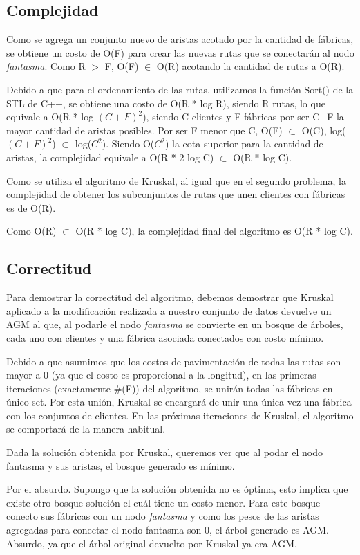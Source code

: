 \documentclass[a4paper, 10pt, twoside]{article}
\begin{document}
\subsection{Complejidad}
Como se agrega un conjunto nuevo de aristas acotado por la cantidad de fábricas, se obtiene un costo de O(F) para crear las nuevas rutas que se conectarán al nodo \textit{fantasma}. Como R $>$ F, O(F) $\in$ O(R) acotando la cantidad de rutas a O(R).

Debido a que para el ordenamiento de las rutas, utilizamos la función Sort() de la STL de C++, se obtiene una costo de O(R * log R), siendo R rutas, lo que equivale a O(R * log $(C+F)^2$), siendo C clientes y F fábricas por ser C+F la mayor cantidad de aristas posibles. Por ser F menor que C, O(F) $\subset$ O(C), log($(C+F)^2$) $\subset$ log($C^2$). Siendo O($C^2$) la cota superior para la cantidad de aristas, la complejidad equivale a O(R * 2 log C) $\subset$ O(R * log C).

Como se utiliza el algoritmo de Kruskal, al igual que en el segundo problema, la complejidad de obtener los subconjuntos de rutas que unen clientes con fábricas es de O(R).

Como O(R) $\subset$ O(R * log C), la complejidad final del algoritmo es O(R * log C).
\subsection{Correctitud}
Para demostrar la correctitud del algoritmo, debemos demostrar que Kruskal aplicado a la modificación realizada a nuestro conjunto de datos devuelve un AGM al que, al podarle el nodo \textit{fantasma} se convierte en un bosque de árboles, cada uno con clientes y una fábrica asociada conectados con costo mínimo.

Debido a que asumimos que los costos de pavimentación de todas las rutas son mayor a 0 (ya que el costo es proporcional a la longitud), en las primeras iteraciones (exactamente \#(F)) del algoritmo, se unirán todas las fábricas en único set. Por esta unión, Kruskal se encargará de unir una única vez una fábrica con los conjuntos de clientes. En las próximas iteraciones de Kruskal, el algoritmo se comportará  de la manera habitual.

Dada la solución obtenida por Kruskal, queremos ver que al podar el nodo fantasma y sus aristas, el bosque generado es mínimo.

Por el absurdo. Supongo que la solución obtenida no es óptima, esto implica que existe otro bosque solución el cuál tiene un costo menor. Para este bosque conecto sus fábricas con un nodo \textit{fantasma} y como los pesos de las aristas agregadas para conectar el nodo fantasma son 0, el árbol generado es AGM. Absurdo, ya que el árbol original devuelto por Kruskal ya era AGM.
\end{document}
